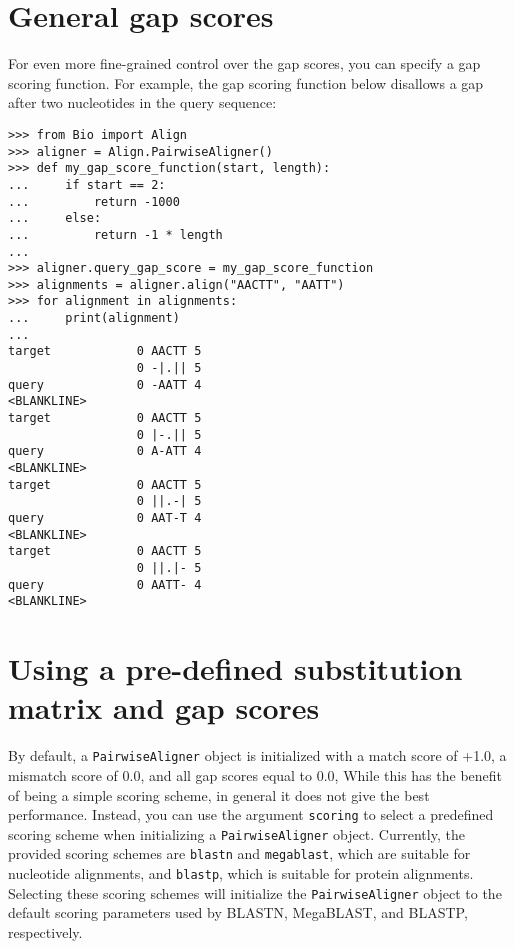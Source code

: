 \section{General gap scores}
\label{sec:pairwise-general-gapscores}

For even more fine-grained control over the gap scores, you can specify a gap scoring function. For example, the gap scoring function below disallows a gap after two nucleotides in the query sequence:

\begin{verbatim}
>>> from Bio import Align
>>> aligner = Align.PairwiseAligner()
>>> def my_gap_score_function(start, length):
...     if start == 2:
...         return -1000
...     else:
...         return -1 * length
...
>>> aligner.query_gap_score = my_gap_score_function
>>> alignments = aligner.align("AACTT", "AATT")
>>> for alignment in alignments:
...     print(alignment)
...
target            0 AACTT 5
                  0 -|.|| 5
query             0 -AATT 4
<BLANKLINE>
target            0 AACTT 5
                  0 |-.|| 5
query             0 A-ATT 4
<BLANKLINE>
target            0 AACTT 5
                  0 ||.-| 5
query             0 AAT-T 4
<BLANKLINE>
target            0 AACTT 5
                  0 ||.|- 5
query             0 AATT- 4
<BLANKLINE>
\end{verbatim}

\section{Using a pre-defined substitution matrix and gap scores}
\label{sec:pairwise-predefined-scoring}

By default, a \verb+PairwiseAligner+ object is initialized with a match score of +1.0, a mismatch score of 0.0, and all gap scores equal to 0.0, While this has the benefit of being a simple scoring scheme, in general it does not give the best performance. Instead, you can use the argument \verb+scoring+ to select a predefined scoring scheme when initializing a \verb+PairwiseAligner+ object. Currently, the provided scoring schemes are \verb+blastn+ and \verb+megablast+, which are suitable for nucleotide alignments, and \verb+blastp+, which is suitable for protein alignments. Selecting these scoring schemes will initialize the \verb+PairwiseAligner+ object to the default scoring parameters used by BLASTN, MegaBLAST, and BLASTP, respectively.


